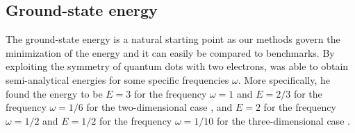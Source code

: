 \subsection{Ground-state energy} \label{sec:groundstateenergy}
The ground-state energy is a natural starting point as our methods govern the minimization of the energy and it can easily be compared to benchmarks. By exploiting the symmetry of quantum dots with two electrons, \citeauthor{taut_two_1993} was able to obtain semi-analytical energies for some specific frequencies $\omega$. More specifically, he found the energy to be $E=3$ for the frequency $\omega=1$ and $E=2/3$ for the frequency $\omega=1/6$ for the two-dimensional case \cite{taut_two_1993}, and $E=2$ for the frequency $\omega=1/2$ and $E=1/2$ for the frequency $\omega=1/10$ for the three-dimensional case \cite{taut_two_1994}.

